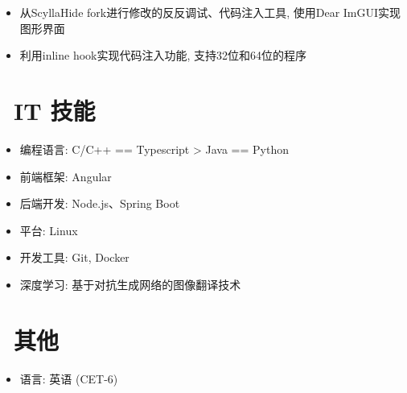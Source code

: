 \documentclass{resume}
\begin{document}

\begin{onehalfspacing}
\begin{itemize}
  \item 从ScyllaHide fork进行修改的反反调试、代码注入工具, 使用Dear ImGUI实现图形界面
  \item 利用inline hook实现代码注入功能, 支持32位和64位的程序
\end{itemize}
\end{onehalfspacing}

\section{\faCogs\ IT 技能}
\begin{itemize}[parsep=0.5ex]
  \item 编程语言: C/C++ == Typescript > Java == Python
  \item 前端框架: Angular
  \item 后端开发: Node.js、Spring Boot
  \item 平台: Linux
  \item 开发工具: Git, Docker
  \item 深度学习: 基于对抗生成网络的图像翻译技术
\end{itemize}


\section{\faInfo\ 其他}
\begin{itemize}[parsep=0.5ex]
  \item 语言: 英语 (CET-6)
\end{itemize}

%
%
\end{document}
